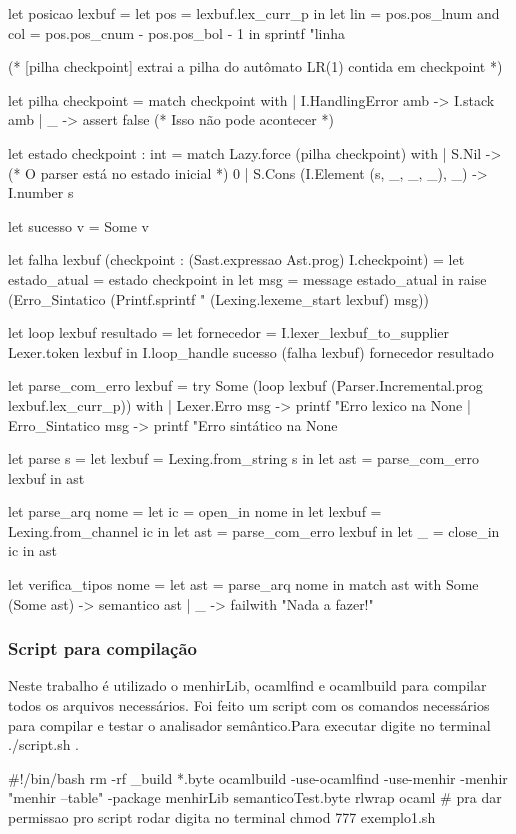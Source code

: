 \documentclass[12pt,a4paper,twoside]{report}
\begin{document}
\begin{terminal}
let posicao lexbuf =
    let pos = lexbuf.lex_curr_p in
    let lin = pos.pos_lnum
    and col = pos.pos_cnum - pos.pos_bol - 1 in
    sprintf "linha %

(* [pilha checkpoint] extrai a pilha do autômato LR(1) contida em checkpoint *)

let pilha checkpoint =
  match checkpoint with
  | I.HandlingError amb -> I.stack amb
  | _ -> assert false (* Isso não pode acontecer *)

let estado checkpoint : int =
  match Lazy.force (pilha checkpoint) with
  | S.Nil -> (* O parser está no estado inicial *)
     0
  | S.Cons (I.Element (s, _, _, _), _) ->
     I.number s

let sucesso v = Some v

let falha lexbuf (checkpoint : (Sast.expressao Ast.prog) I.checkpoint) =
  let estado_atual = estado checkpoint in
  let msg = message estado_atual in
  raise (Erro_Sintatico (Printf.sprintf "%
                                      (Lexing.lexeme_start lexbuf) msg))

let loop lexbuf resultado =
  let fornecedor = I.lexer_lexbuf_to_supplier Lexer.token lexbuf in
  I.loop_handle sucesso (falha lexbuf) fornecedor resultado


let parse_com_erro lexbuf =
  try
    Some (loop lexbuf (Parser.Incremental.prog lexbuf.lex_curr_p))
  with
  | Lexer.Erro msg ->
     printf "Erro lexico na %
     None
  | Erro_Sintatico msg ->
     printf "Erro sintático na %
     None

let parse s =
  let lexbuf = Lexing.from_string s in
  let ast = parse_com_erro lexbuf in
  ast

let parse_arq nome =
  let ic = open_in nome in
  let lexbuf = Lexing.from_channel ic in
  let ast = parse_com_erro lexbuf in
  let _ = close_in ic in
  ast

let verifica_tipos nome =
  let ast = parse_arq nome in
  match ast with
    Some (Some ast) -> semantico ast
  | _ -> failwith "Nada a fazer!\n"

\end{terminal}
\subsubsection{Script para compilação}
 Neste trabalho é utilizado o menhirLib, ocamlfind e ocamlbuild para compilar todos os arquivos necessários.
Foi feito um script com os comandos necessários para compilar e testar o analisador semântico.Para executar digite no terminal ./script.sh .
\begin{terminal}
#!/bin/bash
rm -rf  _build  *.byte
 ocamlbuild -use-ocamlfind -use-menhir -menhir "menhir --table" -package menhirLib semanticoTest.byte
rlwrap ocaml
# pra dar permissao pro script rodar digita no terminal chmod 777 exemplo1.sh

\end{terminal}
\end{document}
